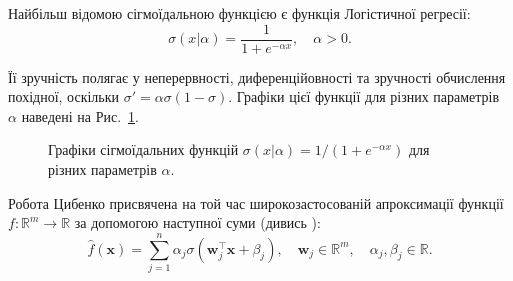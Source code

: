 \begin{example}
	Найбільш відомою сігмоїдальною функцією є функція Логістичної регресії:
	\begin{equation}
		\sigma(x|\alpha) = \frac{1}{1+e^{-\alpha x}}, \quad \alpha > 0.
	\end{equation}

	Її зручність полягає у неперервності, диференційовності та зручності
	обчислення похідної, оскільки $\sigma' = \alpha\sigma(1-\sigma)$.
	Графіки цієї функції для різних параметрів $\alpha$ наведені на
	Рис.~\ref{fig:sigmoids}.
\end{example}

\begin{figure}
\centering
{}
\caption{Графіки сігмоїдальних функцій $\sigma(x|\alpha)=1/(1+e^{-\alpha x})$ для різних параметрів $\alpha$.}
\label{fig:sigmoids}
\end{figure}

Робота Цибенко присвячена на той час широкозастосованій апроксимації функції $f:
\mathbb{R}^m \to \mathbb{R}$ за допомогою наступної суми (дивись
\cite{old-nets}):
\begin{equation}\label{eq:cybenko-g}
	\hat{f}(\mathbf{x}) = \sum_{j=1}^n \alpha_j \sigma(\boldsymbol{w}_j^{\top}\mathbf{x} + \beta_j), \quad \boldsymbol{w}_j \in \mathbb{R}^m, \quad \alpha_j,\beta_j \in \mathbb{R}.
\end{equation}

